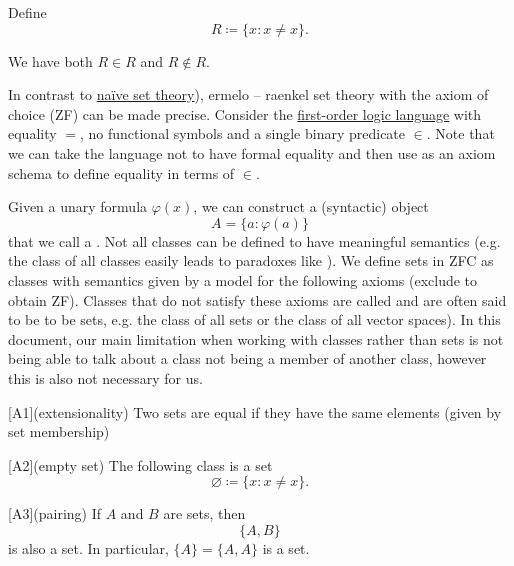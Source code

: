 \begin{example}\label{ex:russels_paradox_sets}
  Define
  \begin{equation*}
    R \coloneqq \{ x \colon x \neq x \}.
  \end{equation*}

  We have both \( R \in R \) and \( R \not\in R \).
\end{example}

\begin{definition}\label{def:set_zfc}\cite[271]{Enderton1977}
  In contrast to \hyperref[def:set_naive]{na\"ive set theory}), ermelo – raenkel set theory with the axiom of choice (ZF) can be made precise. Consider the \hyperref[def:first_order_logic_language]{first-order logic language} with equality \( = \), no functional symbols and a single binary predicate \( \in \). Note that we can take the language not to have formal equality and then use  as an axiom schema to define equality in terms of \( \in \).

  Given a unary formula \( \varphi(x) \), we can construct a (syntactic) object
  \begin{equation*}
    A = \{ a \colon \varphi(a) \}
  \end{equation*}
  that we call a . Not all classes can be defined to have meaningful semantics (e.g. the class of all classes easily leads to paradoxes like ). We define sets in ZFC as classes with semantics given by a model for the following axioms (exclude  to obtain ZF). Classes that do not satisfy these axioms are called  and are often said to be  to be sets, e.g. the class of all sets or the class of all vector spaces). In this document, our main limitation when working with classes rather than sets is not being able to talk about a class not being a member of another class, however this is also not necessary for us.

  \begin{description}
    [A1](extensionality) Two sets are equal if they have the same elements (given by set membership)

    [A2](empty set) The following class is a set
    \begin{equation*}
      \varnothing \coloneqq \{ x \colon x \neq x \}.
    \end{equation*}

    [A3](pairing) If \( A \) and \( B \) are sets, then
    \begin{equation*}
      \{ A, B \}
    \end{equation*}
    is also a set. In particular, \( \{ A \} = \{ A, A \} \) is a set.


\end{description}
\end{definition}
